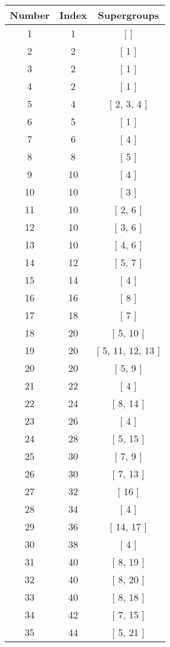 \begin{center}
\begin{longtable}[H]{|| c c c ||}
\hline
Number & Index & Supergroups \\ 
\hline
1 & 1 & [ ] \\ 
\hline
2 & 2 & [ 1 ] \\ 
\hline
3 & 2 & [ 1 ] \\ 
\hline
4 & 2 & [ 1 ] \\ 
\hline
5 & 4 & [ 2, 3, 4 ] \\ 
\hline
6 & 5 & [ 1 ] \\ 
\hline
7 & 6 & [ 4 ] \\ 
\hline
8 & 8 & [ 5 ] \\ 
\hline
9 & 10 & [ 4 ] \\ 
\hline
10 & 10 & [ 3 ] \\ 
\hline
11 & 10 & [ 2, 6 ] \\ 
\hline
12 & 10 & [ 3, 6 ] \\ 
\hline
13 & 10 & [ 4, 6 ] \\ 
\hline
14 & 12 & [ 5, 7 ] \\ 
\hline
15 & 14 & [ 4 ] \\ 
\hline
16 & 16 & [ 8 ] \\ 
\hline
17 & 18 & [ 7 ] \\ 
\hline
18 & 20 & [ 5, 10 ] \\ 
\hline
19 & 20 & [ 5, 11, 12, 13 ] \\ 
\hline
20 & 20 & [ 5, 9 ] \\ 
\hline
21 & 22 & [ 4 ] \\ 
\hline
22 & 24 & [ 8, 14 ] \\ 
\hline
23 & 26 & [ 4 ] \\ 
\hline
24 & 28 & [ 5, 15 ] \\ 
\hline
25 & 30 & [ 7, 9 ] \\ 
\hline
26 & 30 & [ 7, 13 ] \\ 
\hline
27 & 32 & [ 16 ] \\ 
\hline
28 & 34 & [ 4 ] \\ 
\hline
29 & 36 & [ 14, 17 ] \\ 
\hline
30 & 38 & [ 4 ] \\ 
\hline
31 & 40 & [ 8, 19 ] \\ 
\hline
32 & 40 & [ 8, 20 ] \\ 
\hline
33 & 40 & [ 8, 18 ] \\ 
\hline
34 & 42 & [ 7, 15 ] \\ 
\hline
35 & 44 & [ 5, 21 ] \\ 

\end{longtable}
\end{center}
